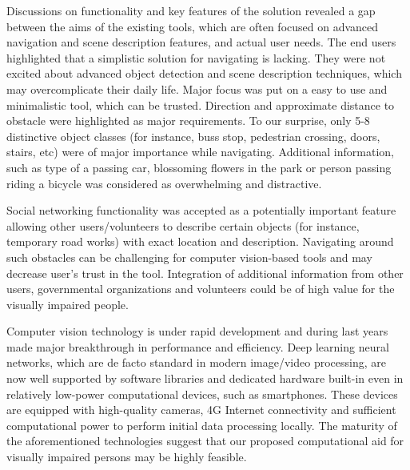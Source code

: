 \documentclass[10pt,conference,compsocconf]{IEEEtran}
\begin{document}




Discussions on functionality and key features of the solution revealed a gap between the aims of the existing tools, which are often focused on advanced navigation and scene description features, and actual user needs. The end users highlighted that a simplistic solution for navigating is lacking. They were not excited about advanced object detection and scene description techniques, which may overcomplicate their daily life. Major focus was put on a easy to use and minimalistic tool, which can be trusted. Direction and approximate distance to obstacle were highlighted as major requirements. To our surprise, only 5-8 distinctive object classes (for instance, buss stop, pedestrian crossing, doors, stairs, etc) were of major importance while navigating. Additional information, such as type of a passing car, blossoming flowers in the park or person passing riding a bicycle was considered as overwhelming and distractive. 

Social networking functionality was accepted as a potentially important feature allowing other users/volunteers to describe certain objects (for instance, temporary road works) with exact location and description. Navigating around such obstacles can be challenging for computer vision-based tools and may decrease user's trust in the tool. Integration of additional information from other users, governmental organizations and volunteers could be of high value for the visually impaired people. 

Computer vision technology is under rapid development and during last years made major breakthrough in performance and efficiency. Deep learning neural networks, which are de facto standard in modern image/video processing, are now well supported by software libraries and dedicated hardware built-in even in relatively low-power computational devices, such as smartphones. These devices are equipped with high-quality cameras, 4G Internet connectivity and sufficient computational power to perform initial data processing locally. The maturity of the aforementioned technologies suggest that our proposed computational aid for visually impaired persons may be highly feasible. 
\end{document}
